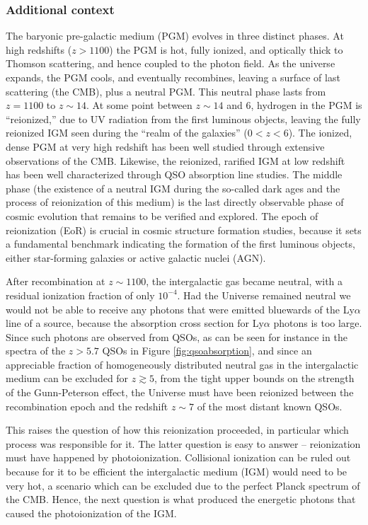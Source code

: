 \documentclass[a4paper,11pt]{article}
\begin{document}
\subsubsection{Additional context}

{\noindent}The baryonic pre-galactic medium (PGM) evolves in three distinct phases. At high redshifts ($z>1100$) the PGM is hot, fully ionized, and optically thick to Thomson scattering, and hence coupled to the photon field. As the universe expands, the PGM cools, and eventually recombines, leaving a surface of last scattering (the CMB), plus a neutral PGM. This neutral phase lasts from $z=1100$ to $z\sim14$. At some point between $z\sim14$ and $6$, hydrogen in the PGM is ``reionized,'' due to UV radiation from the first luminous objects, leaving the fully reionized IGM seen during the ``realm of the galaxies'' ($0<z<6$). The ionized, dense PGM at very high redshift has been well studied through extensive observations of the CMB. Likewise, the reionized, rarified IGM at low redshift has been well characterized through QSO absorption line studies. The middle phase (the existence of a neutral IGM during the so-called dark ages and the process of reionization of this medium) is the last directly observable phase of cosmic evolution that remains to be verified and explored. The epoch of reionization (EoR) is crucial in cosmic structure formation studies, because it sets a fundamental benchmark indicating the formation of the first luminous objects, either star-forming galaxies or active galactic nuclei (AGN).

{\noindent}After recombination at $z\sim1100$, the intergalactic gas became neutral, with a residual ionization fraction of only $10^{-4}$. Had the Universe remained neutral we would not be able to receive any photons that were emitted bluewards of the Ly$\alpha$ line of a source, because the absorption cross section for Ly$\alpha$ photons is too large. Since such photons are observed from QSOs, as can be seen for instance in the spectra of the $z>5.7$ QSOs in Figure \ref{fig:qsoabsorption}, and since an appreciable fraction of homogeneously distributed neutral gas in the intergalactic medium can be excluded for $z\gtrsim5$, from the tight upper bounds on the strength of the Gunn-Peterson effect, the Universe must have been reionized between the recombination epoch and the redshift $z\sim7$ of the most distant known QSOs.

{\noindent}This raises the question of how this reionization proceeded, in particular which process was responsible for it. The latter question is easy to answer -- reionization must have happened by photoionization. Collisional ionization can be ruled out because for it to be efficient the intergalactic medium (IGM) would need to be very hot, a scenario which can be excluded due to the perfect Planck spectrum of the CMB. Hence, the next question is what produced the energetic photons that caused the photoionization of the IGM.
\end{document}
